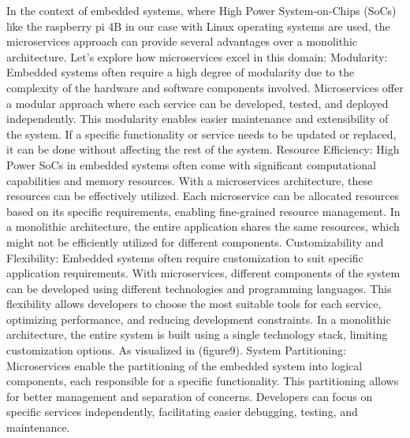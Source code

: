 \documentclass[
12pt,
oneside, 
onehalfspacing, 
nolistspacing, 
parskip, 
chapterinoneline, 
]{AASTCOMPUTER}
\begin{document}
In the context of embedded systems, where High Power System-on-Chips (SoCs) like the raspberry pi 4B in our case with Linux operating systems are used, the microservices approach can provide several advantages over a monolithic architecture. Let's explore how microservices excel in this domain:
Modularity: Embedded systems often require a high degree of modularity due to the complexity of the hardware and software components involved. Microservices offer a modular approach where each service can be developed, tested, and deployed independently. This modularity enables easier maintenance and extensibility of the system. If a specific functionality or service needs to be updated or replaced, it can be done without affecting the rest of the system.
Resource Efficiency: High Power SoCs in embedded systems often come with significant computational capabilities and memory resources. With a microservices architecture, these resources can be effectively utilized. Each microservice can be allocated resources based on its specific requirements, enabling fine-grained resource management. In a monolithic architecture, the entire application shares the same resources, which might not be efficiently utilized for different components.
Customizability and Flexibility: Embedded systems often require customization to suit specific application requirements. With microservices, different components of the system can be developed using different technologies and programming languages. This flexibility allows developers to choose the most suitable tools for each service, optimizing performance, and reducing development constraints. In a monolithic architecture, the entire system is built using a single technology stack, limiting customization options. As visualized in (figure9).
System Partitioning: Microservices enable the partitioning of the embedded system into logical components, each responsible for a specific functionality. This partitioning allows for better management and separation of concerns. Developers can focus on specific services independently, facilitating easier debugging, testing, and maintenance.
\end{document}
